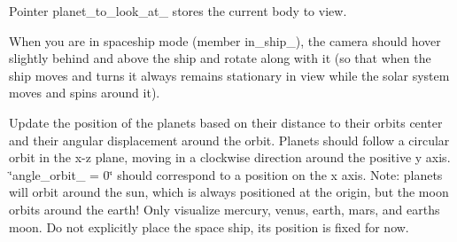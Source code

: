 \begin{DoxyRefList}
\begin{DoxyItemize}
\item Pointer {\ttfamily planet\+\_\+to\+\_\+look\+\_\+at\+\_\+} stores the current body to view.
\item When you are in spaceship mode (member in\+\_\+ship\+\_\+), the camera should hover slightly behind and above the ship and rotate along with it (so that when the ship moves and turns it always remains stationary in view while the solar system moves and spins around it). 
\end{DoxyItemize}
\item[\label{todo__todo000002}%
\hypertarget{todo__todo000002}{}%
Member \hyperlink{classSolar__viewer_ab86b680afd2e29e8ead0ae9bdb2cef48}{Solar\+\_\+viewer\+:\+:update\+\_\+body\+\_\+positions} ()]Update the position of the planets based on their distance to their orbit\textquotesingle{}s center and their angular displacement around the orbit. Planets should follow a circular orbit in the x-\/z plane, moving in a clockwise direction around the positive y axis. \char`\"{}angle\+\_\+orbit\+\_\+ = 0\char`\"{} should correspond to a position on the x axis. Note\+: planets will orbit around the sun, which is always positioned at the origin, but the moon orbits around the earth! Only visualize mercury, venus, earth, mars, and earth\textquotesingle{}s moon. Do not explicitly place the space ship, it\textquotesingle{}s position is fixed for now. 
\end{DoxyRefList}